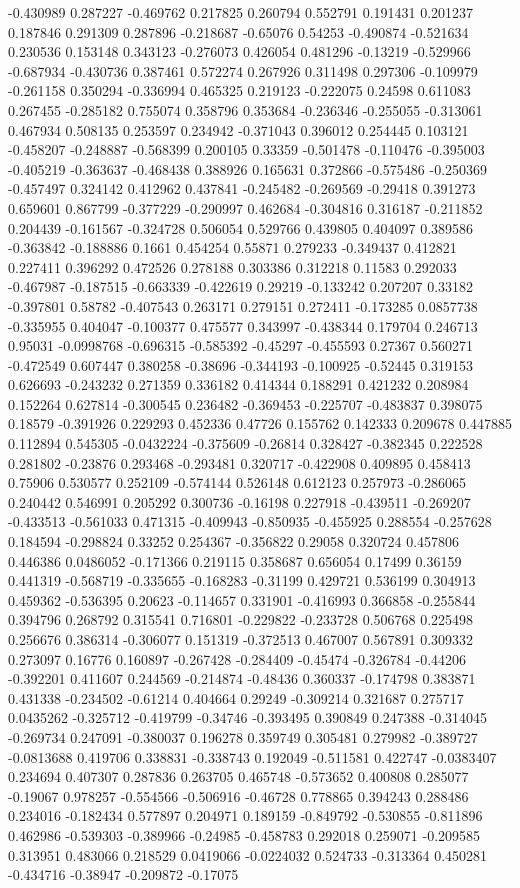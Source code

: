 -0.430989 0.287227 -0.469762 0.217825 0.260794 0.552791 0.191431 0.201237 0.187846 0.291309 0.287896 -0.218687 -0.65076 0.54253 -0.490874 -0.521634 0.230536 0.153148 0.343123 -0.276073 0.426054 0.481296 -0.13219 -0.529966 -0.687934 -0.430736 0.387461 0.572274 0.267926 0.311498 0.297306 -0.109979 -0.261158 0.350294 -0.336994 0.465325 0.219123 -0.222075 0.24598 0.611083 0.267455 -0.285182 0.755074 0.358796 0.353684 -0.236346 -0.255055 -0.313061 0.467934 0.508135 0.253597 0.234942 -0.371043 0.396012 0.254445 0.103121 -0.458207 -0.248887 -0.568399 0.200105 0.33359 -0.501478 -0.110476 -0.395003 -0.405219 -0.363637 -0.468438 0.388926 0.165631 0.372866 -0.575486 -0.250369 -0.457497 0.324142 0.412962 0.437841 -0.245482 -0.269569 -0.29418 0.391273 0.659601 0.867799 -0.377229 -0.290997 0.462684 -0.304816 0.316187 -0.211852 0.204439 -0.161567 -0.324728 0.506054 0.529766 0.439805 0.404097 0.389586 -0.363842 -0.188886 0.1661 0.454254 0.55871 0.279233 -0.349437 0.412821 0.227411 0.396292 0.472526 0.278188 0.303386 0.312218 0.11583 0.292033 -0.467987 -0.187515 -0.663339 -0.422619 0.29219 -0.133242 0.207207 0.33182 -0.397801 0.58782 -0.407543 0.263171 0.279151 0.272411 -0.173285 0.0857738 -0.335955 0.404047 -0.100377 0.475577 0.343997 -0.438344 0.179704 0.246713 0.95031 -0.0998768 -0.696315 -0.585392 -0.45297 -0.455593 0.27367 0.560271 -0.472549 0.607447 0.380258 -0.38696 -0.344193 -0.100925 -0.52445 0.319153 0.626693 -0.243232 0.271359 0.336182 0.414344 0.188291 0.421232 0.208984 0.152264 0.627814 -0.300545 0.236482 -0.369453 -0.225707 -0.483837 0.398075 0.18579 -0.391926 0.229293 0.452336 0.47726 0.155762 0.142333 0.209678 0.447885 0.112894 0.545305 -0.0432224 -0.375609 -0.26814 0.328427 -0.382345 0.222528 0.281802 -0.23876 0.293468 -0.293481 0.320717 -0.422908 0.409895 0.458413 0.75906 0.530577 0.252109 -0.574144 0.526148 0.612123 0.257973 -0.286065 0.240442 0.546991 0.205292 0.300736 -0.16198 0.227918 -0.439511 -0.269207 -0.433513 -0.561033 0.471315 -0.409943 -0.850935 -0.455925 0.288554 -0.257628 0.184594 -0.298824 0.33252 0.254367 -0.356822 0.29058 0.320724 0.457806 0.446386 0.0486052 -0.171366 0.219115 0.358687 0.656054 0.17499 0.36159 0.441319 -0.568719 -0.335655 -0.168283 -0.31199 0.429721 0.536199 0.304913 0.459362 -0.536395 0.20623 -0.114657 0.331901 -0.416993 0.366858 -0.255844 0.394796 0.268792 0.315541 0.716801 -0.229822 -0.233728 0.506768 0.225498 0.256676 0.386314 -0.306077 0.151319 -0.372513 0.467007 0.567891 0.309332 0.273097 0.16776 0.160897 -0.267428 -0.284409 -0.45474 -0.326784 -0.44206 -0.392201 0.411607 0.244569 -0.214874 -0.48436 0.360337 -0.174798 0.383871 0.431338 -0.234502 -0.61214 0.404664 0.29249 -0.309214 0.321687 0.275717 0.0435262 -0.325712 -0.419799 -0.34746 -0.393495 0.390849 0.247388 -0.314045 -0.269734 0.247091 -0.380037 0.196278 0.359749 0.305481 0.279982 -0.389727 -0.0813688 0.419706 0.338831 -0.338743 0.192049 -0.511581 0.422747 -0.0383407 0.234694 0.407307 0.287836 0.263705 0.465748 -0.573652 0.400808 0.285077 -0.19067 0.978257 -0.554566 -0.506916 -0.46728 0.778865 0.394243 0.288486 0.234016 -0.182434 0.577897 0.204971 0.189159 -0.849792 -0.530855 -0.811896 0.462986 -0.539303 -0.389966 -0.24985 -0.458783 0.292018 0.259071 -0.209585 0.313951 0.483066 0.218529 0.0419066 -0.0224032 0.524733 -0.313364 0.450281 -0.434716 -0.38947 -0.209872 -0.17075 